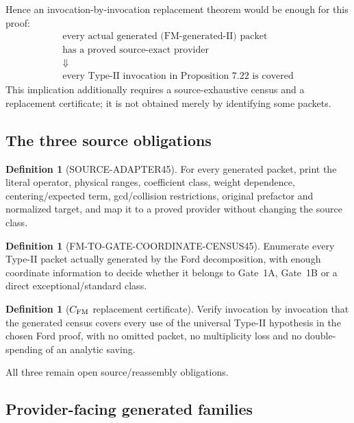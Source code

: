 \documentclass[11pt]{article}
\theoremstyle{definition}
\newtheorem{definition}[theorem]{Definition}
\newcommand{\1}{\mathbf 1}
\begin{document}
Hence an invocation-by-invocation replacement theorem would be enough for this proof:
\[
\boxed{
\begin{gathered}
\text{every actual generated (FM-generated-II) packet}\\
\text{has a proved source-exact provider}\\
\Downarrow\\
\text{every Type-II invocation in Proposition 7.22 is covered}
\end{gathered}}
\tag{FM-replacement-logic}
\]
This implication additionally requires a source-exhaustive census and a replacement
certificate; it is not obtained merely by identifying some packets.

\subsection{The three source obligations}

\begin{definition}[SOURCE-ADAPTER45]
For every generated packet, print the literal operator, physical ranges, coefficient
class, weight dependence, centering/expected term, gcd/collision restrictions, original
prefactor and normalized target, and map it to a proved provider without changing the
source class.
\end{definition}

\begin{definition}[FM-TO-GATE-COORDINATE-CENSUS45]
Enumerate every Type-II packet actually generated by the Ford decomposition, with enough
coordinate information to decide whether it belongs to Gate~1A, Gate~1B or a direct
exceptional/standard class.
\end{definition}

\begin{definition}[$C_{\rm FM}$ replacement certificate]
Verify invocation by invocation that the generated census covers every use of the universal
Type-II hypothesis in the chosen Ford proof, with no omitted packet, no multiplicity loss
and no double-spending of an analytic saving.
\end{definition}

All three remain open source/reassembly obligations.

\subsection{Provider-facing generated families}
\end{document}
